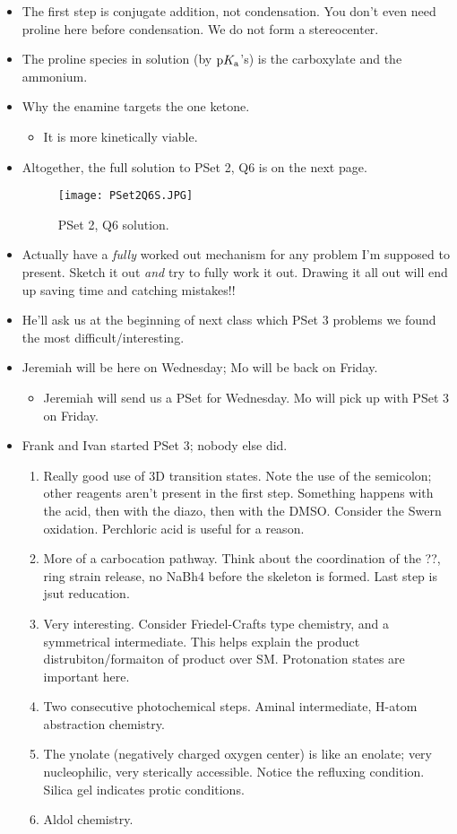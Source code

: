 \documentclass[../notes.tex]{subfiles}
\begin{document}
\begin{itemize}
    \item The first step is conjugate addition, not condensation. You don't even need proline here before condensation. We do not form a stereocenter.
    \item The proline species in solution (by $\textup{p}K_\textup{a}$'s) is the carboxylate and the ammonium.
    \item Why the enamine targets the one ketone.
    \begin{itemize}
        \item It is more kinetically viable.
    \end{itemize}
    \item Altogether, the full solution to PSet 2, Q6 is on the next page.
    \begin{figure}[h!]
        \centering
        \texttt{[image: PSet2Q6S.JPG]}
        \caption{PSet 2, Q6 solution.}
        \label{fig:PSet2Q6S}
    \end{figure}
    \pagebreak
    \item Actually have a \emph{fully} worked out mechanism for any problem I'm supposed to present. Sketch it out \emph{and} try to fully work it out. Drawing it all out will end up saving time and catching mistakes!!
    \item He'll ask us at the beginning of next class which PSet 3 problems we found the most difficult/interesting.
    \item Jeremiah will be here on Wednesday; Mo will be back on Friday.
    \begin{itemize}
        \item Jeremiah will send us a PSet for Wednesday. Mo will pick up with PSet 3 on Friday.
    \end{itemize}
    \item Frank and Ivan started PSet 3; nobody else did.
    \begin{enumerate}
        \item Really good use of 3D transition states. Note the use of the semicolon; other reagents aren't present in the first step. Something happens with the acid, then with the diazo, then with the DMSO. Consider the Swern oxidation. Perchloric acid is useful for a reason.
        \item More of a carbocation pathway. Think about the coordination of the ??, ring strain release, no NaBh4 before the skeleton is formed. Last step is jsut reducation.
        \item Very interesting. Consider Friedel-Crafts type chemistry, and a symmetrical intermediate. This helps explain the product distrubiton/formaiton of product over SM. Protonation states are important here.
        \item Two consecutive photochemical steps. Aminal intermediate, H-atom abstraction chemistry.
        \item The ynolate (negatively charged oxygen center) is like an enolate; very nucleophilic, very sterically accessible. Notice the refluxing condition. Silica gel indicates protic conditions.
        \item Aldol chemistry.
    \end{enumerate}
\end{itemize}
\end{document}
